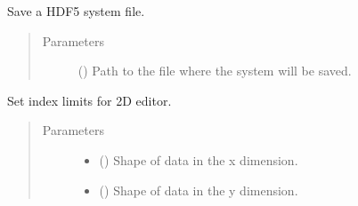 \documentclass[a4paper,10pt,english]{sphinxmanual}
\begin{document}
\begin{fulllineitems}
\begin{fulllineitems}
\begin{quote}
\begin{description}
\end{description}\end{quote}

\end{fulllineitems}


\begin{fulllineitems}
\label{\detokenize{autodoc/mrsprint/mrsprint:mrsprint.mainwindow.MainWindow.saveSystem}}
Save a HDF5 system file.
\begin{quote}\begin{description}
\item[{Parameters}] \leavevmode
{} () \textendash{} Path to the file where the system will be saved.

\end{description}\end{quote}

\end{fulllineitems}


\begin{fulllineitems}
\label{\detokenize{autodoc/mrsprint/mrsprint:mrsprint.mainwindow.MainWindow.setIndexLimits2DEditor}}
Set index limits for 2D editor.
\begin{quote}\begin{description}
\item[{Parameters}] \leavevmode\begin{itemize}
\item {} 
 () \textendash{} Shape of data in the x dimension.

\item {} 
 () \textendash{} Shape of data in the y dimension.


\end{itemize}
\end{description}
\end{quote}
\end{fulllineitems}
\end{fulllineitems}
\end{document}
